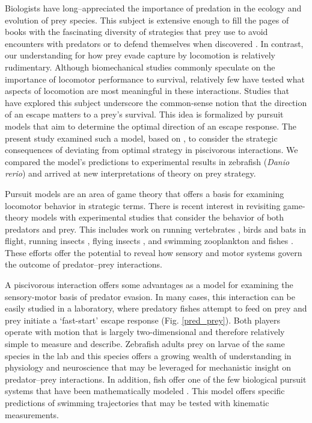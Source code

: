 \documentclass[12pt]{article}
\begin{document}
Biologists have long--appreciated the importance of predation in the ecology and evolution of prey species. This subject is extensive enough to fill the pages of books with the fascinating diversity of strategies that prey use to avoid encounters with predators \citep[e.g.][]{Ruxton:2004vb} or to defend themselves when discovered \citep[e.g.][]{Emlen:2014wb, Evans:1990va}. 
In contrast, our understanding for how prey evade capture by locomotion is relatively rudimentary. Although biomechanical studies commonly speculate on the importance of locomotor performance to survival, relatively few have tested what aspects of locomotion are most meaningful in these interactions. 
Studies that have explored this subject \citep[reviewed by][]{Domenici:2011tv} underscore the common-sense notion that the direction of an escape matters to a prey's survival. This idea is formalized by pursuit models that aim to determine the optimal direction of an escape response. 
The present study examined such a model, based on \cite{Weihs:1984tb}, to consider the strategic consequences of deviating from optimal strategy in piscivorous interactions. We compared the model's predictions to experimental results in zebrafish (\textit{Danio rerio}) \citep{Stewart:2014cm} and arrived at new interpretations of theory on prey strategy.

Pursuit models are an area of game theory that offers a basis for examining locomotor behavior in strategic terms. There is recent interest in revisiting game-theory models \citep[e.g.][]{Howland:1974, Weihs:1984tb, Djemai:2010hp, Gal:2014ve} with experimental studies that consider the behavior of both predators and prey. 
This includes work on running vertebrates \citep[e.g.][]{Wilson:2014fd}, birds \citep[e.g.][]{Kullberg:1998ur} and bats \citep[e.g.][]{Ghose:2006dk} in flight, running insects \citep{Domenici:2008kra}, flying insects \citep[e.g.][]{Combes:2012eta}, and swimming zooplankton \citep[e.g.][]{Arnott:1999wx, Heuch:2007kk} and fishes \citep[e.g.][]{Domenici:2000un}. 
These efforts offer the potential to reveal how sensory and motor systems govern the outcome of predator--prey interactions. 

A piscivorous interaction offers some advantages as a model for examining the sensory-motor basis of predator evasion. In many cases, this interaction can be easily studied in a laboratory, where predatory fishes attempt to feed on prey and prey initiate a `fast-start' escape response (Fig. \ref{pred_prey}). 
Both players operate with motion that is largely two-dimensional and therefore relatively simple to measure and describe. 
Zebrafish adults prey on larvae of the same species in the lab \citep{Stewart:2013bh} and this species offers a growing wealth of understanding in physiology and neuroscience \citep[e.g.][]{McLean:2011gi, Briggs:2002uf} that may be leveraged for mechanistic insight on predator--prey interactions. 
In addition, fish offer one of the few biological pursuit systems that have been mathematically modeled \citep{Weihs:1984tb}. This model offers specific predictions of swimming trajectories that may be tested with kinematic measurements. 
\end{document}
